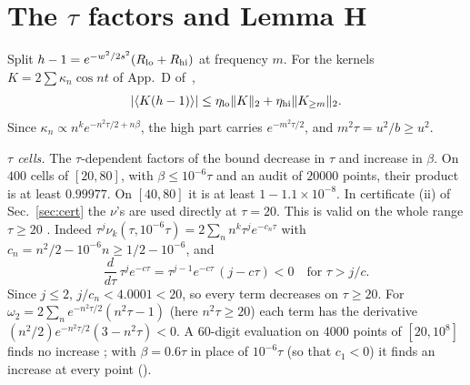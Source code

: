 \section{The $\tau$ factors and Lemma H}
\label{app:tau}

\begin{lemma}[Lemma H] \proofst
Split $h-1=e^{-w^2/2s^2}(R_{\rm lo}+R_{\rm hi})$ at frequency $m$.
For the kernels $K=2\sum\kappa_n\cos nt$ of App.~D of~\cite{F},
\begin{equation}
|\langle K(h-1)\rangle|\le\eta_{\rm lo}\|K\|_2+\eta_{\rm hi}\|K_{\ge m}\|_2 .
\end{equation}
Since $\kappa_n\propto n^ke^{-n^2\tau/2+n\beta}$, the high part carries $e^{-m^2\tau/2}$, and $m^2\tau=u^2/b\ge u^2$.
\end{lemma}

\emph{$\tau$ cells.} 
The $\tau$-dependent factors of the bound decrease in $\tau$ and increase in $\beta$.
On $400$ cells of $[20,80]$, with $\beta\le10^{-6}\tau$ and an audit of $20000$ points, their product is at least $0.99977$.
On $[40,80]$ it is at least $1-1.1\times10^{-8}$.
In certificate (ii) of Sec.~\ref{sec:cert} the $\nu$'s are used directly at $\tau=20$.
This is valid on the whole range $\tau\ge20$ \proofst.
Indeed $\tau^j\nu_k(\tau,10^{-6}\tau)=2\sum_n n^k\tau^je^{-c_n\tau}$ with $c_n=n^2/2-10^{-6}n\ge1/2-10^{-6}$, and
\begin{equation}
\frac{d}{d\tau}\,\tau^je^{-c\tau}=\tau^{j-1}e^{-c\tau}\,(j-c\tau)<0\quad\text{for }\tau>j/c .
\end{equation}
Since $j\le2$, $j/c_n<4.0001<20$, so every term decreases on $\tau\ge20$.
For $\omega_2=2\sum_ne^{-n^2\tau/2}(n^2\tau-1)$ (here $n^2\tau\ge20$) each term has the derivative $(n^2/2)e^{-n^2\tau/2}(3-n^2\tau)<0$.
A $60$-digit evaluation on $4000$ points of $[20,10^8]$ finds no increase \numst; with $\beta=0.6\tau$ in place of $10^{-6}\tau$ (so that $c_1<0$) it finds an increase at every point ().
